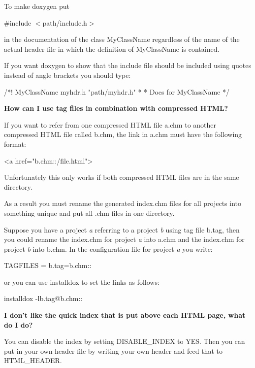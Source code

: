 \begin{DoxyEnumerate}
To make doxygen put \par
\par
 {\ttfamily  \#include $<$path/include.h$>$ }

in the documentation of the class MyClassName regardless of the name of the actual header file in which the definition of MyClassName is contained.

If you want doxygen to show that the include file should be included using quotes instead of angle brackets you should type: \begin{DoxyVerb}
/*! \class MyClassName myhdr.h "path/myhdr.h"
 *
 *  Docs for MyClassName
 */
\end{DoxyVerb}



\item {\bfseries How can I use tag files in combination with compressed HTML?}

If you want to refer from one compressed HTML file {\ttfamily a.chm} to another compressed HTML file called {\ttfamily b.chm}, the link in {\ttfamily a.chm} must have the following format: \begin{DoxyVerb}
<a href="b.chm::/file.html">
\end{DoxyVerb}
 Unfortunately this only works if both compressed HTML files are in the same directory.

As a result you must rename the generated {\ttfamily index.chm} files for all projects into something unique and put all {\ttfamily .chm} files in one directory.

Suppose you have a project {\itshape a\/} referring to a project {\itshape b\/} using tag file {\ttfamily b.tag}, then you could rename the {\ttfamily index.chm} for project {\itshape a\/} into {\ttfamily a.chm} and the {\ttfamily index.chm} for project {\itshape b\/} into {\ttfamily b.chm}. In the configuration file for project {\itshape a\/} you write: \begin{DoxyVerb}
TAGFILES = b.tag=b.chm::
\end{DoxyVerb}
 or you can use {\ttfamily installdox} to set the links as follows: \begin{DoxyVerb}
installdox -lb.tag@b.chm::
\end{DoxyVerb}



\item {\bfseries I don't like the quick index that is put above each HTML page, what do I do?}

You can disable the index by setting DISABLE\_\-INDEX to YES. Then you can put in your own header file by writing your own header and feed that to HTML\_\-HEADER.



\end{DoxyEnumerate}
